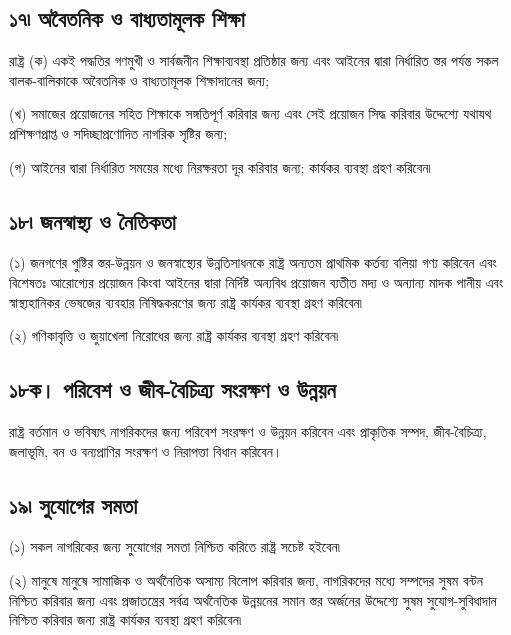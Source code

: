 \documentclass[11pt]{article}
\begin{document}
\subsection{১৭৷ অবৈতনিক ও বাধ্যতামূলক শিক্ষা}
\label{sec:org23a9d92}
রাষ্ট্র
(ক) একই পদ্ধতির গণমুখী ও সার্বজনীন শিক্ষাব্যবস্থা প্রতিষ্ঠার জন্য এবং আইনের
    দ্বারা নির্ধারিত স্তর পর্যন্ত সকল বালক-বালিকাকে অবৈতনিক ও বাধ্যতামূলক
    শিক্ষাদানের জন্য;

(খ) সমাজের প্রয়োজনের সহিত শিক্ষাকে সঙ্গতিপূর্ণ করিবার জন্য এবং সেই প্রয়োজন
    সিদ্ধ করিবার উদ্দেশ্যে যথাযথ প্রশিক্ষণপ্রাপ্ত ও সদিচ্ছাপ্রণোদিত নাগরিক সৃষ্টির
    জন্য;

(গ) আইনের দ্বারা নির্ধারিত সময়ের মধ্যে নিরক্ষরতা দূর করিবার জন্য;
    কার্যকর ব্যবস্থা গ্রহণ করিবেন৷

\subsection{১৮৷ জনস্বাস্থ্য ও নৈতিকতা}
\label{sec:org00abb7f}
(১) জনগণের পুষ্টির স্তর-উন্নয়ন ও জনস্বাস্থ্যের উন্নতিসাধনকে রাষ্ট্র অন্যতম
    প্রাথমিক কর্তব্য বলিয়া গণ্য করিবেন এবং বিশেষতঃ আরোগ্যের প্রয়োজন কিংবা আইনের
    দ্বারা নির্দিষ্ট অন্যবিধ প্রয়োজন ব্যতীত মদ্য ও অন্যান্য মাদক পানীয় এবং
    স্বাস্থ্যহানিকর ভেষজের ব্যবহার নিষিদ্ধকরণের জন্য রাষ্ট্র কার্যকর ব্যবস্থা গ্রহণ
    করিবেন৷

(২) গণিকাবৃত্তি ও জুয়াখেলা নিরোধের জন্য রাষ্ট্র কার্যকর ব্যবস্থা গ্রহণ করিবেন৷

\subsection{১৮ক। পরিবেশ ও জীব-বৈচিত্র্য সংরক্ষণ ও উন্নয়ন}
\label{sec:org60939fe}
রাষ্ট্র বর্তমান ও ভবিষ্যৎ নাগরিকদের জন্য পরিবেশ সংরক্ষণ ও উন্নয়ন করিবেন এবং
প্রাকৃতিক সম্পদ, জীব-বৈচিত্র্য, জলাভূমি, বন ও বন্যপ্রাণির সংরক্ষণ ও নিরাপত্তা
বিধান করিবেন।

\subsection{১৯৷ সুযোগের সমতা}
\label{sec:orgfc819d7}
(১) সকল নাগরিকের জন্য সুযোগের সমতা নিশ্চিত করিতে রাষ্ট্র সচেষ্ট হইবেন৷

(২) মানুষে মানুষে সামাজিক ও অর্থনৈতিক অসাম্য বিলোপ করিবার জন্য, নাগরিকদের
    মধ্যে সম্পদের সুষম বন্টন নিশ্চিত করিবার জন্য এবং প্রজাতন্ত্রের সর্বত্র অর্থনৈতিক
    উন্নয়নের সমান স্তর অর্জনের উদ্দেশ্যে সুষম সুযোগ-সুবিধাদান নিশ্চিত করিবার জন্য
    রাষ্ট্র কার্যকর ব্যবস্থা গ্রহণ করিবেন৷
\end{document}
